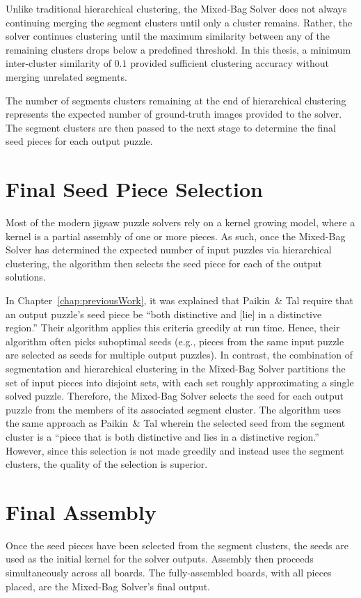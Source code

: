 Unlike traditional hierarchical clustering, the Mixed-Bag Solver does not always continuing merging the segment clusters  until only a cluster remains. Rather, the solver continues clustering until the maximum similarity between any of the remaining clusters drops below a predefined threshold.  In this thesis, a minimum inter-cluster similarity of $0.1$ provided sufficient clustering accuracy without merging unrelated segments.

The number of segments clusters remaining at the end of hierarchical clustering represents the expected number of ground-truth images provided to the solver.  The segment clusters are then passed to the next stage to determine the final seed pieces for each output puzzle.

\section{Final Seed Piece Selection}\label{sec:finalSeedPiece}

Most of the modern jigsaw puzzle solvers \cite{pomeranz2011, sholomon2013, paikin2015} rely on a kernel growing model, where a kernel is a partial assembly of one or more pieces.  As such, once the Mixed-Bag Solver has determined the expected number of input puzzles via hierarchical clustering, the algorithm then selects the seed piece for each of the output solutions. 

In Chapter~\ref{chap:previousWork}, it was explained that Paikin~\& Tal require that an output puzzle's seed piece be ``both distinctive and [lie] in a distinctive region.''  Their algorithm applies this criteria greedily at run time.  Hence, their algorithm often picks suboptimal seeds (e.g., pieces from the same input puzzle are selected as seeds for multiple output puzzles).  In contrast, the combination of segmentation and hierarchical clustering in the Mixed-Bag Solver partitions the set of input pieces into disjoint sets, with each set roughly approximating a single solved puzzle.  Therefore, the Mixed-Bag Solver selects the seed for each output puzzle from the members of its associated segment cluster.  The algorithm uses the same approach as Paikin~\& Tal wherein the selected seed from the segment cluster is a ``piece that is both distinctive and lies in a distinctive region.''  However, since this selection is not made greedily and instead uses the segment clusters, the quality of the selection is superior.

\section{Final Assembly}

Once the seed pieces have been selected from the segment clusters, the seeds are used as the initial kernel for the solver outputs.  Assembly then proceeds simultaneously across all boards.  The fully-assembled boards, with all pieces placed, are the Mixed-Bag Solver's final output.